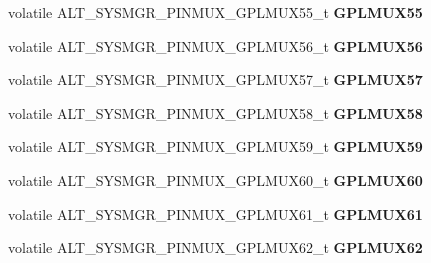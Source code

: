 \begin{DoxyCompactItemize}
volatile A\+L\+T\+\_\+\+S\+Y\+S\+M\+G\+R\+\_\+\+P\+I\+N\+M\+U\+X\+\_\+\+G\+P\+L\+M\+U\+X55\+\_\+t {\bfseries G\+P\+L\+M\+U\+X55}
\item 
\mbox{\label{structALT__SYSMGR__PINMUX__s_ac7497d5bd67eb0cfac889fc0fac0458e}} 
volatile A\+L\+T\+\_\+\+S\+Y\+S\+M\+G\+R\+\_\+\+P\+I\+N\+M\+U\+X\+\_\+\+G\+P\+L\+M\+U\+X56\+\_\+t {\bfseries G\+P\+L\+M\+U\+X56}
\item 
\mbox{\label{structALT__SYSMGR__PINMUX__s_a2280581e300fce2199bb997d29a9a30c}} 
volatile A\+L\+T\+\_\+\+S\+Y\+S\+M\+G\+R\+\_\+\+P\+I\+N\+M\+U\+X\+\_\+\+G\+P\+L\+M\+U\+X57\+\_\+t {\bfseries G\+P\+L\+M\+U\+X57}
\item 
\mbox{\label{structALT__SYSMGR__PINMUX__s_acfb86ffb44799228307f0a5a0778cd4a}} 
volatile A\+L\+T\+\_\+\+S\+Y\+S\+M\+G\+R\+\_\+\+P\+I\+N\+M\+U\+X\+\_\+\+G\+P\+L\+M\+U\+X58\+\_\+t {\bfseries G\+P\+L\+M\+U\+X58}
\item 
\mbox{\label{structALT__SYSMGR__PINMUX__s_a89750862b3ab2e7e5575d9c6e94fec1e}} 
volatile A\+L\+T\+\_\+\+S\+Y\+S\+M\+G\+R\+\_\+\+P\+I\+N\+M\+U\+X\+\_\+\+G\+P\+L\+M\+U\+X59\+\_\+t {\bfseries G\+P\+L\+M\+U\+X59}
\item 
\mbox{\label{structALT__SYSMGR__PINMUX__s_a974d77ace8287ce9ea45c0ca3e0bc218}} 
volatile A\+L\+T\+\_\+\+S\+Y\+S\+M\+G\+R\+\_\+\+P\+I\+N\+M\+U\+X\+\_\+\+G\+P\+L\+M\+U\+X60\+\_\+t {\bfseries G\+P\+L\+M\+U\+X60}
\item 
\mbox{\label{structALT__SYSMGR__PINMUX__s_a27ea8012d65425264155d1f0b55d9088}} 
volatile A\+L\+T\+\_\+\+S\+Y\+S\+M\+G\+R\+\_\+\+P\+I\+N\+M\+U\+X\+\_\+\+G\+P\+L\+M\+U\+X61\+\_\+t {\bfseries G\+P\+L\+M\+U\+X61}
\item 
\mbox{\label{structALT__SYSMGR__PINMUX__s_ad8743b26ed0c346b7e70bde00674bd70}} 
volatile A\+L\+T\+\_\+\+S\+Y\+S\+M\+G\+R\+\_\+\+P\+I\+N\+M\+U\+X\+\_\+\+G\+P\+L\+M\+U\+X62\+\_\+t {\bfseries G\+P\+L\+M\+U\+X62}
\item 
\mbox{\label{structALT__SYSMGR__PINMUX__s_a5a373fa95cf88813e92d1b8723599e92}} 

\end{DoxyCompactItemize}
